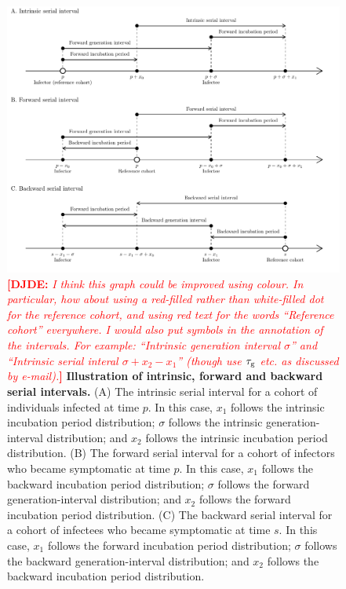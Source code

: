 \documentclass[12pt]{article}
\newcommand{\comment}{\showcomment}
\newcommand{\showcomment}[3]{\textcolor{#1}{\textbf{[#2: }\textsl{#3}\textbf{]}}}
\newcommand{\djde}[1]{\comment{red}{DJDE}{#1}}
\newcommand{\psymp}{\ensuremath{p}} %
\newcommand{\ssymp}{\ensuremath{s}} %
\newcommand{\gtime}{\sigma} %
\begin{document}
\begin{figure}[!th]
\includegraphics[width=\textwidth]{serial_guide.pdf}
\caption{ \djde{I think this graph could be improved using colour.  In
    particular, how about using a red-filled rather than white-filled
    dot for the reference cohort, and using red text for the words
    ``Reference cohort'' everywhere.  I would also put symbols in the
    annotation of the intervals.  For example: ``Intrinsic generation
    interval $\sigma$'' and ``Intrinsic serial interal
    $\sigma+x_2-x_1$'' (though use $\tau_{\rm g}$ etc.
    as discussed by e-mail).}  \textbf{Illustration of intrinsic,
    forward and backward serial intervals.}  (A) The intrinsic serial
  interval for a cohort of individuals infected at time $\psymp$.  In
  this case, $x_1$ follows the intrinsic incubation period
  distribution; $\gtime$ follows the intrinsic generation-interval
  distribution; and $x_2$ follows the intrinsic incubation period
  distribution.  (B) The forward serial interval for a cohort of
  infectors who became symptomatic at time $\psymp$.  In this case,
  $x_1$ follows the backward incubation period distribution; $\gtime$
  follows the forward generation-interval distribution; and $x_2$
  follows the forward incubation period distribution.  (C) The
  backward serial interval for a cohort of infectees who became
  symptomatic at time $\ssymp$.  In this case, $x_1$ follows the
  forward incubation period distribution; $\gtime$ follows the
  backward generation-interval distribution; and $x_2$ follows the
  backward incubation period distribution.  }
\label{fig:diagram}
\end{figure}
\end{document}
